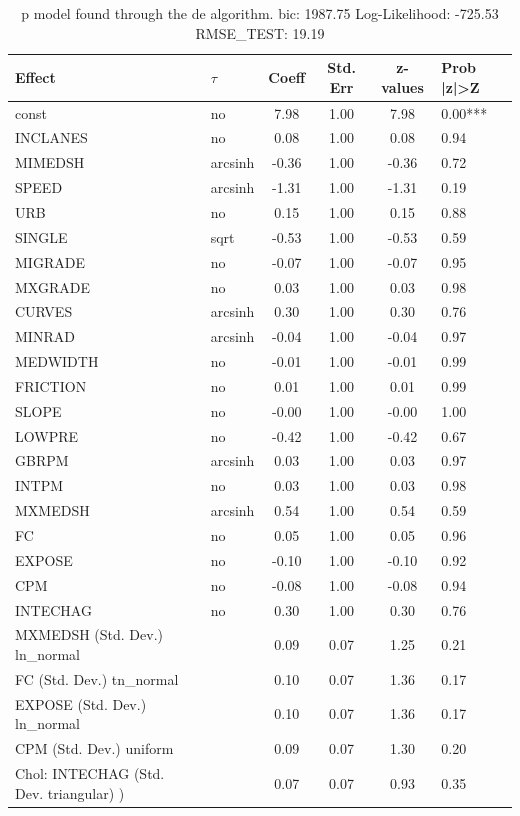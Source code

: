 \begin{table}
	\caption{p model found through the de algorithm. bic: 1987.75 Log-Likelihood: -725.53 RMSE_TEST: 19.19}
	\begin{center}
		\begin{tabular}{|l|l|c|c|c|l|}
			\hline
			Effect & $\tau$ & Coeff & Std. Err & z-values & Prob |z|>Z \\
			\hline
			const & no & 7.98 & 1.00 & 7.98 & 0.00*** \\
			\hline
			INCLANES & no & 0.08 & 1.00 & 0.08 & 0.94 \\
			\hline
			MIMEDSH & arcsinh & -0.36 & 1.00 & -0.36 & 0.72 \\
			\hline
			SPEED & arcsinh & -1.31 & 1.00 & -1.31 & 0.19 \\
			\hline
			URB & no & 0.15 & 1.00 & 0.15 & 0.88 \\
			\hline
			SINGLE & sqrt & -0.53 & 1.00 & -0.53 & 0.59 \\
			\hline
			MIGRADE & no & -0.07 & 1.00 & -0.07 & 0.95 \\
			\hline
			MXGRADE & no & 0.03 & 1.00 & 0.03 & 0.98 \\
			\hline
			CURVES & arcsinh & 0.30 & 1.00 & 0.30 & 0.76 \\
			\hline
			MINRAD & arcsinh & -0.04 & 1.00 & -0.04 & 0.97 \\
			\hline
			MEDWIDTH & no & -0.01 & 1.00 & -0.01 & 0.99 \\
			\hline
			FRICTION & no & 0.01 & 1.00 & 0.01 & 0.99 \\
			\hline
			SLOPE & no & -0.00 & 1.00 & -0.00 & 1.00 \\
			\hline
			LOWPRE & no & -0.42 & 1.00 & -0.42 & 0.67 \\
			\hline
			GBRPM & arcsinh & 0.03 & 1.00 & 0.03 & 0.97 \\
			\hline
			INTPM & no & 0.03 & 1.00 & 0.03 & 0.98 \\
			\hline
			MXMEDSH & arcsinh & 0.54 & 1.00 & 0.54 & 0.59 \\
			\hline
			FC & no & 0.05 & 1.00 & 0.05 & 0.96 \\
			\hline
			EXPOSE & no & -0.10 & 1.00 & -0.10 & 0.92 \\
			\hline
			CPM & no & -0.08 & 1.00 & -0.08 & 0.94 \\
			\hline
			INTECHAG & no & 0.30 & 1.00 & 0.30 & 0.76 \\
			\hline
			MXMEDSH (Std. Dev.) ln_normal &  & 0.09 & 0.07 & 1.25 & 0.21 \\
			\hline
			FC (Std. Dev.) tn_normal &  & 0.10 & 0.07 & 1.36 & 0.17 \\
			\hline
			EXPOSE (Std. Dev.) ln_normal &  & 0.10 & 0.07 & 1.36 & 0.17 \\
			\hline
			CPM (Std. Dev.) uniform &  & 0.09 & 0.07 & 1.30 & 0.20 \\
			\hline
			 Chol: INTECHAG (Std. Dev. triangular) ) &  & 0.07 & 0.07 & 0.93 & 0.35 \\
			\hline
		\end{tabular}
	\end{center}
\end{table}